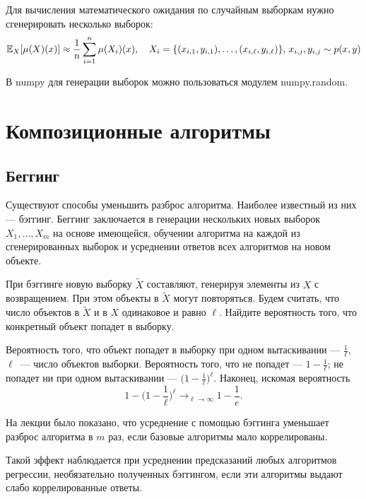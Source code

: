 \documentclass[12pt,fleqn]{article}
\begin{document}
Для вычисления математического ожидания по случайным выборкам нужно сгенерировать несколько выборок: 
\[
    \mathbb{E}_{X}
    [\mu(X)(x)]
    \approx
    \frac{1}{n}
    \sum_{i=1}^n
        \mu(X_i)(x),
        \quad
        X_i=\{(x_{i, 1}, y_{i, 1}), \dots, (x_{i, \ell}, y_{i, \ell})\}, \, x_{i,j}, y_{i, j} \sim p(x, y)
\]

В numpy для генерации выборок можно пользоваться модулем numpy.random. 

\section{Композиционные алгоритмы}
\subsection{Беггинг}
Существуют способы уменьшить разброс алгоритма. Наиболее известный из них --- бэггинг. Беггинг заключается в генерации нескольких новых выборок $X_1, \dots, X_m$ на основе имеющейся, обучении алгоритма на каждой из сгенерированных выборок и усреднении ответов всех алгоритмов на новом объекте.  

\begin{vkProblem}
    При бэггинге новую выборку $\widetilde X$ составляют, генерируя элементы из $X$ с возвращением. При этом объекты в $\widetilde X$ могут повторяться. Будем считать, что число объектов в $\widetilde X$ и в $X$ одинаковое и равно $\ell$. Найдите вероятность того, что конкретный объект попадет в выборку.
    \end{vkProblem}%
    \begin{esSolution}
        
        Вероятность того, что объект попадет в выборку при одном вытаскивании --- $\frac 1 \ell$, $\ell$~--- число объектов выборки. Вероятность того, что не попадет --- $1 - \frac 1 \ell$; не попадет ни при одном вытаскивании --- 
        $\biggl ( 1 - \frac 1 \ell \biggr)^\ell$. Наконец, искомая вероятность
        \[
        1 - \biggl ( 1 - \frac 1 \ell \biggr)^\ell \rightarrow_{\ell \rightarrow \infty}
        1 - \frac 1 e .
        \]
    \end{esSolution}
    
    На лекции было показано, что усреднение с помощью бэггинга уменьшает разброс алгоритма в $m$ раз, если базовые алгоритмы мало коррелированы. 
    
    Такой эффект наблюдается при усреднении предсказаний любых алгоритмов регрессии, необязательно полученных бэггингом, если эти алгоритмы выдают слабо коррелированные ответы.
    
\end{document}
